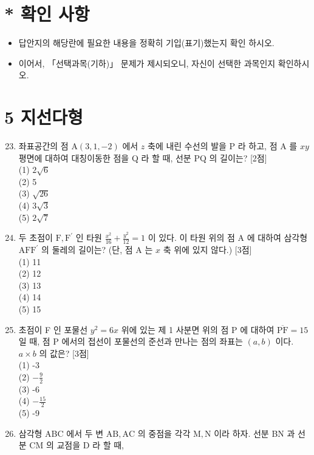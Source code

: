 \documentclass[10pt]{article}
\begin{document}
\section*{* 확인 사항}
\begin{itemize}
  \item 답안지의 해당란에 필요한 내용을 정확히 기입(표기)했는지 확인 하시오.

  \item 이어서, 「선택과목(기하)」 문제가 제시되오니, 자신이 선택한 과목인지 확인하시오.

\end{itemize}

\section*{5 지선다형}
\begin{enumerate}
  \setcounter{enumi}{22}
  \item 좌표공간의 점 \(\mathrm{A}(3,1,-2)\) 에서 \(z\) 축에 내린 수선의 발을 P 라 하고, 점 A 를 \(x y\) 평면에 대하여 대칭이동한 점을 Q 라 할 때, 선분 PQ 의 길이는? [2점]\\
(1) \(2 \sqrt{6}\)\\
(2) 5\\
(3) \(\sqrt{26}\)\\
(4) \(3 \sqrt{3}\)\\
(5) \(2 \sqrt{7}\)

  \item 두 초점이 \(\mathrm{F}, \mathrm{F}^{\prime}\) 인 타원 \(\frac{x^{2}}{16}+\frac{y^{2}}{12}=1\) 이 있다. 이 타원 위의 점 A 에 대하여 삼각형 \(\mathrm{AFF}^{\prime}\) 의 둘레의 길이는? (단, 점 A 는 \(x\) 축 위에 있지 않다.) [3점]\\
(1) 11\\
(2) 12\\
(3) 13\\
(4) 14\\
(5) 15

  \item 초점이 F 인 포물선 \(y^{2}=6 x\) 위에 있는 제 1 사분면 위의 점 P 에 대하여 \(\overline{\mathrm{PF}}=15\) 일 때, 점 P 에서의 접선이 포물선의 준선과 만나는 점의 좌표는 \((a, b)\) 이다. \(a \times b\) 의 값은? [3점]\\
(1) -3\\
(2) \(-\frac{9}{2}\)\\
(3) -6\\
(4) \(-\frac{15}{2}\)\\
(5) -9

  \item 삼각형 ABC 에서 두 변 \(\mathrm{AB}, \mathrm{AC}\) 의 중점을 각각 \(\mathrm{M}, \mathrm{N}\) 이라 하자. 선분 BN 과 선분 CM 의 교점을 D 라 할 때,

\end{enumerate}
\end{document}
